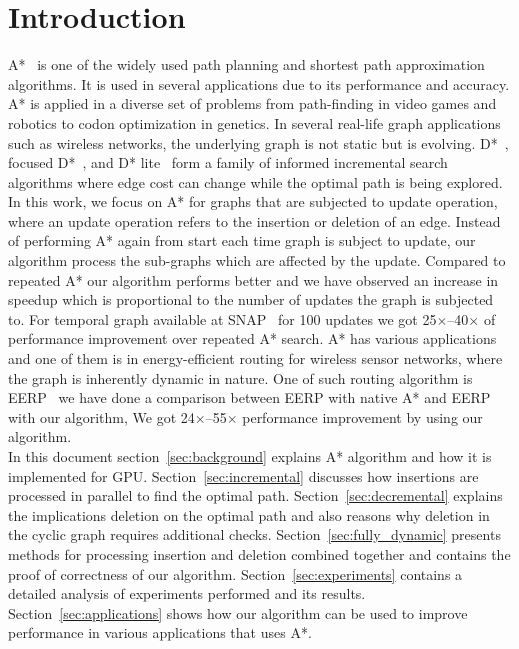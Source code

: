 \documentclass[a4paper]{article}
\begin{document}
\section{Introduction}\label{sec:introduction}
A*~\cite{A*,wiki_a_star} is one of the widely used path planning and shortest path approximation algorithms. It is used in several applications due to its performance and accuracy. A* is applied in a diverse set of problems from path-finding in video games and robotics to codon optimization in genetics. In several real-life graph applications such as wireless networks, the underlying graph is not static but is evolving. D*~\cite{original_D_star, wiki_d_star}, focused D*~\cite{focused_D_star}, and D* lite~\cite{D_star_lite} form a family of informed incremental search algorithms where edge cost can change while the optimal path is being explored. In this work, we focus on A* for graphs that are subjected to update operation, where an update operation refers to the insertion or deletion of an edge. Instead of performing A* again from start each time graph is subject to update, our algorithm process the sub-graphs which are affected by the update. Compared to repeated A* our algorithm performs better and we have observed an increase in speedup which is proportional to the number of updates the graph is subjected to. For temporal graph available at SNAP~\cite{SNAP} for 100 updates we got 25$\times$--40$\times$ of performance improvement over repeated A* search. A* has various applications and one of them is in energy-efficient routing for wireless sensor networks, where the graph is inherently dynamic in nature. One of such routing algorithm is EERP~\cite{WSN2014} we have done a comparison between EERP with native A* and EERP with our algorithm, We got 24$\times$--55$\times$ performance improvement by using our algorithm.
\\
In this document section~\ref{sec:background} explains A* algorithm and how it is implemented for GPU. Section~\ref{sec:incremental} discusses how insertions are processed in parallel to find the optimal path. Section~\ref{sec:decremental} explains the implications deletion on the optimal path and also reasons why deletion in the cyclic graph requires additional checks. Section~\ref{sec:fully_dynamic} presents methods for processing insertion and deletion combined together and contains the proof of correctness of our algorithm. Section~\ref{sec:experiments} contains a detailed analysis of experiments performed and its results. Section~\ref{sec:applications} shows how our algorithm can be used to improve performance in various applications that uses A*.
\end{document}
